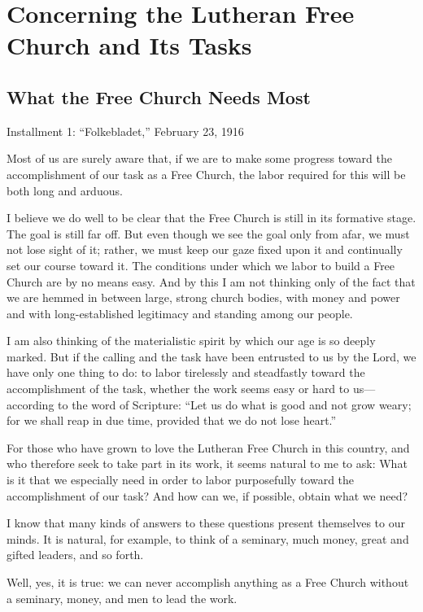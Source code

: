 

\section{Concerning the Lutheran Free Church and Its Tasks}

\subsection{What the Free Church Needs Most}

Installment 1: “Folkebladet,” February 23, 1916

Most of us are surely aware that, if we are to make some progress toward the accomplishment of our task as a Free Church, the labor required for this will be both long and arduous.

I believe we do well to be clear that the Free Church is still in its formative stage. The goal is still far off. But even though we see the goal only from afar, we must not lose sight of it; rather, we must keep our gaze fixed upon it and continually set our course toward it. The conditions under which we labor to build a Free Church are by no means easy. And by this I am not thinking only of the fact that we are hemmed in between large, strong church bodies, with money and power and with long-established legitimacy and standing among our people.

I am also thinking of the materialistic spirit by which our age is so deeply marked. But if the calling and the task have been entrusted to us by the Lord, we have only one thing to do: to labor tirelessly and steadfastly toward the accomplishment of the task, whether the work seems easy or hard to us—according to the word of Scripture: “Let us do what is good and not grow weary; for we shall reap in due time, provided that we do not lose heart.”

For those who have grown to love the Lutheran Free Church in this country, and who therefore seek to take part in its work, it seems natural to me to ask: What is it that we especially need in order to labor purposefully toward the accomplishment of our task? And how can we, if possible, obtain what we need?

I know that many kinds of answers to these questions present themselves to our minds. It is natural, for example, to think of a seminary, much money, great and gifted leaders, and so forth.

Well, yes, it is true: we can never accomplish anything as a Free Church without a seminary, money, and men to lead the work.

